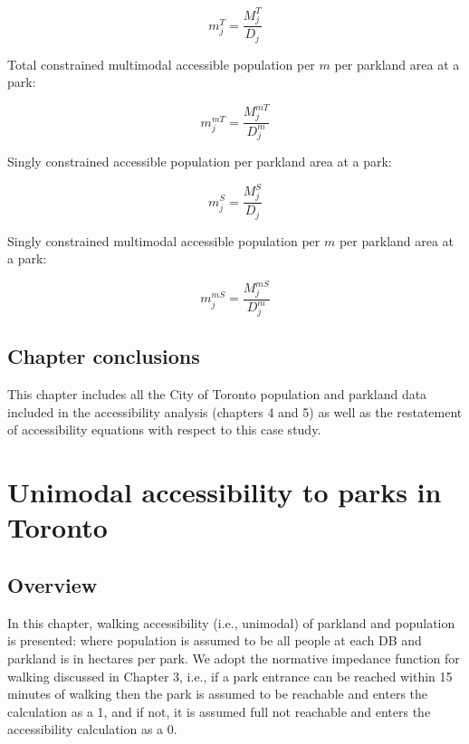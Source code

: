 \documentclass[
11pt, %
oneside, %
english, %
singlespacing, %
]{macthesis} %
\begin{document}
\begin{equation}
\label{eq:total-constrained-market-per-capita}
m^{T}_{j} = \frac{M^{T}_{j}}{D_{j}}
\end{equation} 

Total constrained multimodal accessible population per \(m\) per parkland area at a park:

\begin{equation}
\label{eq:total-constrained-multimodal-market-per-capita}
m^{mT}_{j} = \frac{M^{mT}_{j}}{D^{m}_{j}}
\end{equation} 

Singly constrained accessible population per parkland area at a park:

\begin{equation}
\label{eq:singly-constrained-market-per-capita}
m^{S}_{j} = \frac{M^{S}_{j}}{D_{j}}
\end{equation} 

Singly constrained multimodal accessible population per \(m\) per parkland area at a park:

\begin{equation}
\label{eq:singly-constrained-multimodal-market-per-capita}
m^{mS}_{j} = \frac{M^{mS}_{j}}{D^{m}_{j}}
\end{equation} 

\section{Chapter conclusions}\label{chapter-conclusions-1}

This chapter includes all the City of Toronto population and parkland data included in the accessibility analysis (chapters 4 and 5) as well as the restatement of accessibility equations with respect to this case study.

\chapter{Unimodal accessibility to parks in Toronto}\label{unimodal-accessibility-to-parks-in-toronto}

\section{Overview}\label{overview-4}

In this chapter, walking accessibility (i.e., unimodal) of parkland and population is presented: where population is assumed to be all people at each DB and parkland is in hectares per park. We adopt the normative impedance function for walking discussed in Chapter 3, i.e., if a park entrance can be reached within 15 minutes of walking then the park is assumed to be reachable and enters the calculation as a 1, and if not, it is assumed full not reachable and enters the accessibility calculation as a 0.
\end{document}
